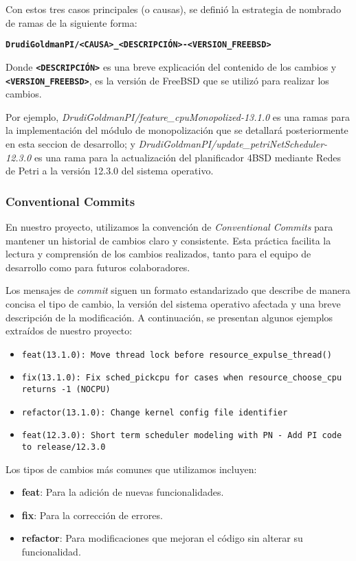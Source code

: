 Con estos tres casos principales (o causas), se definió la estrategia de nombrado de ramas de la siguiente forma:

\begin{center}
    \texttt{\textbf{DrudiGoldmanPI/<CAUSA>\_<DESCRIPCIÓN>-<VERSION\_FREEBSD>}}
\end{center}

Donde \texttt{\textbf{<DESCRIPCIÓN>}} es una breve explicación del contenido de los cambios y \texttt{\textbf{<VERSION\_FREEBSD>}}, es la versión de FreeBSD que se utilizó para realizar los cambios.

Por ejemplo, \textit{DrudiGoldmanPI/feature\_cpuMonopolized-13.1.0} es una ramas para la implementación del módulo de monopolización que se detallará posteriormente en esta seccion de desarrollo; y \textit{DrudiGoldmanPI/update\_petriNetScheduler-12.3.0} es una rama para la actualización del planificador 4BSD mediante Redes de Petri a la versión 12.3.0 del sistema operativo.

\subsubsection{Conventional Commits}
En nuestro proyecto, utilizamos la convención de \textit{Conventional Commits} para mantener un historial de cambios claro y consistente. Esta práctica facilita la lectura y comprensión de los cambios realizados, tanto para el equipo de desarrollo como para futuros colaboradores.

Los mensajes de \textit{commit} siguen un formato estandarizado que describe de manera concisa el tipo de cambio, la versión del sistema operativo afectada y una breve descripción de la modificación. A continuación, se presentan algunos ejemplos extraídos de nuestro proyecto:

\begin{itemize}
    \item \texttt{feat(13.1.0): Move thread lock before resource\_expulse\_thread()}
    \item \texttt{fix(13.1.0): Fix sched\_pickcpu for cases when resource\_choose\_cpu returns -1 (NOCPU)}
    \item \texttt{refactor(13.1.0): Change kernel config file identifier}
    \item \texttt{feat(12.3.0): Short term scheduler modeling with PN - Add PI code to release/12.3.0}
\end{itemize}

Los tipos de cambios más comunes que utilizamos incluyen:
\begin{itemize}
    \item \textbf{feat}: Para la adición de nuevas funcionalidades.
    \item \textbf{fix}: Para la corrección de errores.
    \item \textbf{refactor}: Para modificaciones que mejoran el código sin alterar su funcionalidad.
\end{itemize}


